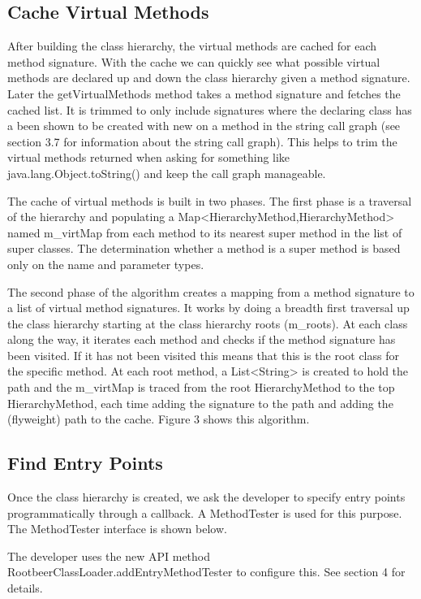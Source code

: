\documentclass[preprint]{sigplanconf}
\begin{document}
\subsection{Cache Virtual Methods}
After building the class hierarchy, the virtual methods are cached for each method signature. With the cache we can quickly see what possible virtual methods are declared up and down the class hierarchy given a method signature. Later the getVirtualMethods method takes a method signature and fetches the cached list. It is trimmed to only include signatures where the declaring class has a been shown to be created with new on a method in the string call graph (see section 3.7 for information about the string call graph). This helps to trim the virtual methods returned when asking for something like java.lang.Object.toString() and keep the call graph manageable.

The cache of virtual methods is built in two phases. The first phase is a traversal of the hierarchy and populating a Map<HierarchyMethod,HierarchyMethod> named m\_virtMap from each method to its nearest super method in the list of super classes. The determination whether a method is a super method is based only on the name and parameter types.

The second phase of the algorithm creates a mapping from a method signature to a list of virtual method signatures. It works by doing a breadth first traversal up the class hierarchy starting at the class hierarchy roots (m\_roots). At each class along the way, it iterates each method and checks if the method signature has been visited. If it has not been visited this means that this is the root class for the specific method. At each root method, a List<String> is created to hold the path and the m\_virtMap is traced from the root HierarchyMethod to the top HierarchyMethod, each time adding the signature to the path and adding the (flyweight) path to the cache. Figure 3 shows this algorithm.

\subsection{Find Entry Points}
Once the class hierarchy is created, we ask the developer to specify entry points programmatically through a callback. A MethodTester is used for this purpose. The MethodTester interface is shown below.

The developer uses the new API method RootbeerClassLoader.addEntryMethodTester to configure this. See section 4 for details.
\end{document}
